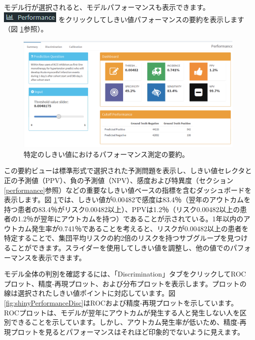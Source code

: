 \documentclass[
  11pt]{book}
\theoremstyle{definition}
\theoremstyle{definition}
\theoremstyle{definition}
\theoremstyle{definition}
\theoremstyle{remark}
\begin{document}
モデル行が選択されると、モデルパフォーマンスも表示できます。\includegraphics{images/PatientLevelPrediction/performance.png} をクリックしてしきい値パフォーマンスの要約を表示します（図 \ref{fig:shinyPerformanceSum}参照）。

\begin{figure}

{\centering \includegraphics[width=1\linewidth]{images/PatientLevelPrediction/shiny/shinyPerformanceSum} 

}

\caption{特定のしきい値におけるパフォーマンス測定の要約。}\label{fig:shinyPerformanceSum}
\end{figure}

この要約ビューは標準形式で選択された予測問題を表示し、しきい値セレクタと正の予測値（PPV）、負の予測値（NPV）、感度および特異度（セクション \ref{performance}参照）などの重要なしきい値ベースの指標を含むダッシュボードを表示します。図 \ref{fig:shinyPerformanceSum}では、しきい値が0.00482で感度は83.4％（翌年のアウトカムを持つ患者の83.4％がリスク0.00482以上）、PPVは1.2％（リスク0.00482以上の患者の1.2％が翌年にアウトカムを持つ）であることが示されている。1年以内のアウトカム発生率が0.741％であることを考えると、リスクが0.00482以上の患者を特定することで、集団平均リスクの約2倍のリスクを持つサブグループを見つけることができます。スライダーを使用してしきい値を調整し、他の値でのパフォーマンスを表示できます。

モデル全体の判別を確認するには、「Discrimination」タブをクリックしてROCプロット、精度-再現プロット、および分布プロットを表示します。プロットの線は選択されたしきい値ポイントに対応しています。図 \ref{fig:shinyPerformanceDisc}はROCおよび精度-再現プロットを示しています。ROCプロットは、モデルが翌年にアウトカムが発生する人と発生しない人を区別できることを示しています。しかし、アウトカム発生率が低いため、精度-再現プロットを見るとパフォーマンスはそれほど印象的でないように見えます。
\end{document}

